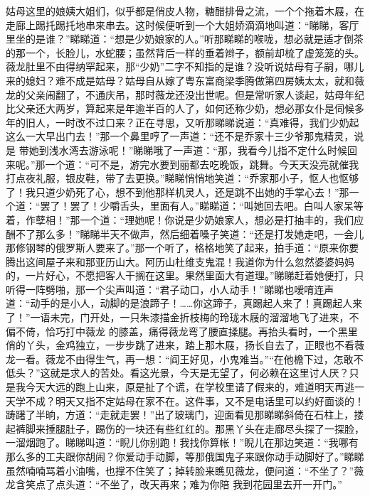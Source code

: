 \documentclass{article}
\begin{document}
姑母这里的娘姨大姐们，似乎都是俏皮人物，糖醋排骨之流，一个个拖着木屐，在走廊上踢托踢托地串来串去。这时候便听到一个大姐娇滴滴地叫道：“睇睇，客厅里坐的是谁？”睇睇道：“想是少奶娘家的人。”听那睇睇的喉咙，想必就是适才倒茶的那一个，长脸儿，水蛇腰；虽然背后一样的垂着辫子，额前却梳了虚笼笼的头。薇龙肚里不由得纳罕起来，那“少奶”二字不知指的是谁？没听说姑母有子嗣，哪儿来的媳妇？难不成是姑母？姑母自从嫁了粤东富商梁季腾做第四房姨太太，就和薇龙的父亲闹翻了，不通庆吊，那时薇龙还没出世呢。但是常听家人谈起，姑母年纪比父亲还大两岁，算起来是年逾半百的人了，如何还称少奶，想必那女仆是伺候多年的旧人，一时改不过口来？正在寻思，又听那睇睇说道：“真难得，我们少奶起这么一大早出门去！”那一个鼻里哼了一声道：“还不是乔家十三少爷那鬼精灵，说是
\newpage
带她到浅水湾去游泳呢！”睇睇哦了一声道：“那，我看今儿指不定什么时候回来呢。”那一个道：“可不是，游完水要到丽都去吃晚饭，跳舞。今天天没亮就催我打点夜礼服，银皮鞋，带了去更换。”睇睇悄悄地笑道：“乔家那小子，怄人也怄够了！我只道少奶死了心，想不到他那样机灵人，还是跳不出她的手掌心去！”那一个道：“罢了！罢了！少嚼舌头，里面有人。”睇睇道：“叫她回去吧。白叫人家呆等着，作孽相！”那一个道：“理她呢！你说是少奶娘家人，想必是打抽丰的，我们应酬不了那么多！”睇睇半天不做声，然后细着嗓子笑道：“还是打发她走吧，一会儿那修钢琴的俄罗斯人要来了。”那一个听了，格格地笑了起来，拍手道：“原来你要腾出这间屋子来和那亚历山大。阿历山杜维支鬼混！我道你为什么忽然婆婆妈妈的，一片好心，不愿把客人干搁在这里。果然里面大有道理。”睇睇赶着她便打，只听得一阵劈啪，那一个尖声叫道：“君子动口，小人动手！”睇睇也嗳唷连声道：“动手的是小人，动脚的是浪蹄子！……你这蹄子，真踢起人来了！真踢起人来了！”一语未完，门开处，一只朱漆描金折枝梅的玲珑木屐的溜溜地飞了进来，不偏不倚，恰巧打中薇龙
\newpage
的膝盖，痛得薇龙弯了腰直揉腿。再抬头看时，一个黑里俏的丫头，金鸡独立，一步步跳了进来，踏上那木屐，扬长自去了，正眼也不看薇龙一看。薇龙不由得生气，再一想：“阎王好见，小鬼难当。”“在他檐下过，怎敢不低头？”这就是求人的苦处。看这光景，今天是无望了，何必赖在这里讨人厌？只是我今天大远的跑上山来，原是扯了个谎，在学校里请了假来的，难道明天再逃一天学不成？明天又指不定姑母在家不在。这件事，又不是电话里可以约好面谈的！踌躇了半晌，方道：“走就走罢！”出了玻璃门，迎面看见那睇睇斜倚在石柱上，搂起裤脚来捶腿肚子，踢伤的一块还有些红红的。那黑丫头在走廊尽头探了一探脸，一溜烟跑了。睇睇叫道：“睨儿你别跑！我找你算帐！”睨儿在那边笑道：“我哪有那么多的工夫跟你胡闹？你爱动手动脚，等那俄国鬼子来跟你动手动脚好了。”睇睇虽然喃喃骂着小油嘴，也撑不住笑了；掉转脸来瞧见薇龙，便问道：“不坐了？”薇龙含笑点了点头道：“不坐了，改天再来；难为你陪
我到花园里去开一开门。” 
\end{document}

